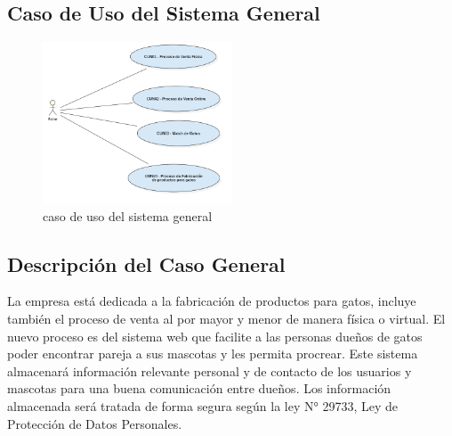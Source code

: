 \documentclass{article}
\begin{document}
\subsection{Caso de Uso del Sistema General}
\begin{figure}[h]
    \begin{center}
        \includegraphics[width=0.5\textwidth]{images/Caso de uso general v2.png}
        \caption{caso de uso del sistema general}
    \end{center}
\end{figure}
\subsection{Descripción del Caso General}
La empresa está dedicada a la fabricación de productos para gatos, incluye también el proceso de venta al por mayor y menor de manera física o virtual.
El nuevo proceso es del sistema web que facilite a las personas dueños de gatos poder encontrar pareja a sus mascotas y les permita procrear. Este sistema almacenará información relevante personal y de contacto de los usuarios y mascotas para una buena comunicación entre dueños. Los información almacenada será tratada de forma segura según la ley N° 29733, Ley de Protección de Datos Personales.
\clearpage
\end{document}
